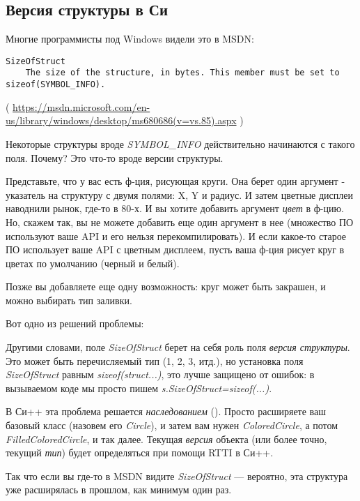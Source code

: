 \subsection{Версия структуры в Си}

Многие программисты под Windows видели это в MSDN:

\begin{lstlisting}
SizeOfStruct
    The size of the structure, in bytes. This member must be set to sizeof(SYMBOL_INFO).
\end{lstlisting}

( \url{https://msdn.microsoft.com/en-us/library/windows/desktop/ms680686(v=vs.85).aspx} )

Некоторые структуры вроде \emph{SYMBOL\_INFO} действительно начинаются с такого поля. Почему?
Это что-то вроде версии структуры.

Представьте, что у вас есть ф-ция, рисующая круги.
Она берет один аргумент - указатель на структуру с двумя полями: X, Y и радиус.
И затем цветные дисплеи наводнили рынок, где-то в 80-х. И вы хотите добавить аргумент \emph{цвет} в ф-цию.
Но, скажем так, вы не можете добавить еще один аргумент в нее (множество ПО используют ваше \ac{API} и его нельзя
перекомпилировать).
И если какое-то старое ПО использует ваше \ac{API} с цветным дисплеем,
пусть ваша ф-ция рисует круг в цветах по умолчанию (черный и белый).

Позже вы добавляете еще одну возможность: круг может быть закрашен, и можно выбирать тип заливки.

Вот одно из решений проблемы:



Другими словами, поле \emph{SizeOfStruct} берет на себя роль поля \emph{версия структуры}.
Это может быть перечисляемый тип (1, 2, 3, итд.), но установка поля \emph{SizeOfStruct} равным \emph{sizeof(struct...)},
это лучше защищено от ошибок: в вызываемом коде мы просто пишем \emph{s.SizeOfStruct=sizeof(...)}.

В Си++ эта проблема решается \emph{наследованием} ().
Просто расширяете ваш базовый класс (назовем его \emph{Circle}),
и затем вам нужен \emph{ColoredCircle}, а потом \emph{FilledColoredCircle}, и так далее.
Текущая \emph{версия} объекта (или более точно, текущий \emph{тип}) будет определяться при помощи \ac{RTTI} в Си++.

Так что если вы где-то в \ac{MSDN} видите \emph{SizeOfStruct} --- вероятно, эта структура уже расширялась в прошлом,
как минимум один раз.

